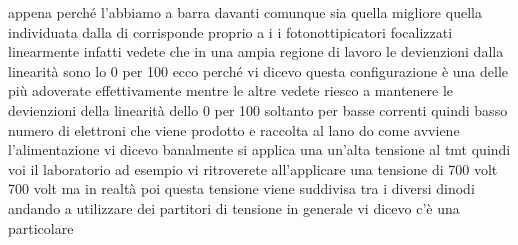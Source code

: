 {appena perché l'abbiamo a barra davanti comunque sia quella migliore quella individuata dalla di corrisponde proprio a i i fotonottipicatori focalizzati linearmente infatti vedete che in una ampia regione di lavoro le devienzioni dalla linearità sono lo 0 per 100 ecco perché vi dicevo questa configurazione è una delle più adoverate effettivamente mentre le altre vedete riesco a mantenere le devienzioni della linearità dello 0 per 100 soltanto per basse correnti quindi basso numero di elettroni che viene prodotto e raccolta al lano do come avviene l'alimentazione vi dicevo banalmente si applica una un'alta tensione al tmt quindi voi il laboratorio ad esempio vi ritroverete all'applicare una tensione di 700 volt 700 volt ma in realtà poi questa tensione viene suddivisa tra i diversi dinodi andando a utilizzare dei partitori di tensione in generale vi dicevo c'è una particolare 

}

